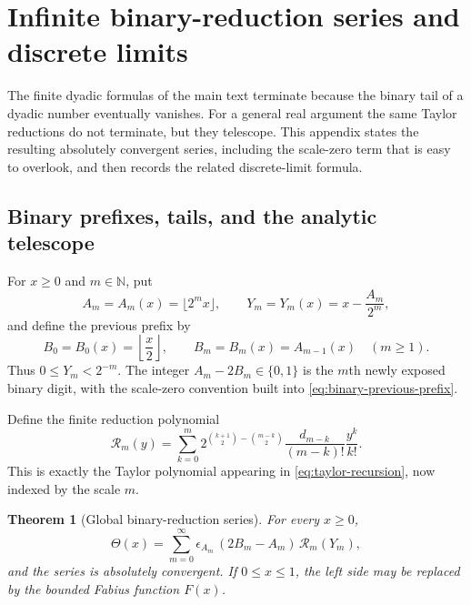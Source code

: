 \documentclass[11pt]{article}
\numberwithin{equation}{section}
\newtheorem{theorem}{Theorem}[section]
\theoremstyle{definition}
\theoremstyle{remark}
\newcommand{\N}{\mathbb{N}}
\newcommand{\Th}{\Theta}
\begin{document}
\appendix

\section{Infinite binary-reduction series and discrete limits}
\label{app:global-series}

The finite dyadic formulas of the main text terminate because the binary tail
of a dyadic number eventually vanishes.  For a general real argument the same
Taylor reductions do not terminate, but they telescope.  This appendix states
the resulting absolutely convergent series, including the scale-zero term
that is easy to overlook, and then records the related discrete-limit
formula.

\subsection{Binary prefixes, tails, and the analytic telescope}

For $x\geq0$ and $m\in\N$, put
\begin{equation}\label{eq:binary-prefix-tail}
 A_m=A_m(x)=\lfloor 2^m x\rfloor,
 \qquad
 Y_m=Y_m(x)=x-\frac{A_m}{2^m},
\end{equation}
and define the previous prefix by
\begin{equation}\label{eq:binary-previous-prefix}
 B_0=B_0(x)=\left\lfloor\frac{x}{2}\right\rfloor,
 \qquad
 B_m=B_m(x)=A_{m-1}(x)\quad(m\geq1).
\end{equation}
Thus $0\leq Y_m<2^{-m}$.  The integer
$A_m-2B_m\in\{0,1\}$ is the $m$th newly exposed binary digit, with the
scale-zero convention built into \eqref{eq:binary-previous-prefix}.

Define the finite reduction polynomial
\begin{equation}\label{eq:reduction-polynomial}
 \mathcal R_m(y)=
 \sum_{k=0}^{m}
 2^{\binom{k+1}{2}-\binom{m-k}{2}}
 \frac{d_{m-k}}{(m-k)!}\frac{y^k}{k!}.
\end{equation}
This is exactly the Taylor polynomial appearing in
\eqref{eq:taylor-recursion}, now indexed by the scale $m$.

\begin{theorem}[Global binary-reduction series]
\label{thm:global-binary-series}
For every $x\geq0$,
\begin{equation}\label{eq:global-binary-series}
 \Th(x)=\sum_{m=0}^{\infty}
 \epsilon_{A_m}\,(2B_m-A_m)\,\mathcal R_m(Y_m),
\end{equation}
and the series is absolutely convergent.  If $0\leq x\leq1$, the left side
may be replaced by the bounded Fabius function $F(x)$.
\end{theorem}
\end{document}
